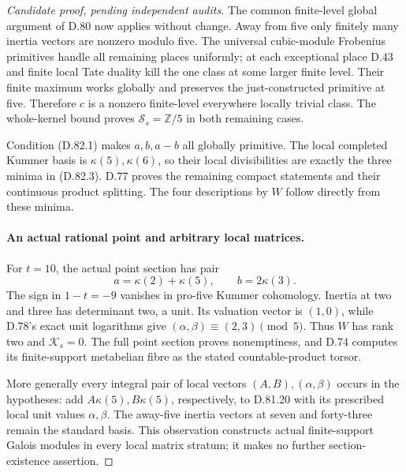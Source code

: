 \begin{proof}[Candidate proof, pending independent audits]
The common finite-level global argument of D.80 now
applies without change. Away from five only finitely
many inertia vectors are nonzero modulo five.
The universal cubic-module Frobenius primitives handle
all remaining places uniformly; at each exceptional
place D.43 and finite local Tate duality kill the one
class at some larger finite level. Their finite maximum
works globally and preserves the just-constructed
primitive at five. Therefore \(c\) is a nonzero
finite-level everywhere locally trivial class. The
whole-kernel bound proves
\(\mathcal S_s=\mathbb Z/5\) in both remaining cases.

Condition (D.82.1) makes \(a,b,a-b\) all globally
primitive. The local completed Kummer basis is
\(\kappa(5),\kappa(6)\), so their local divisibilities
are exactly the three minima in (D.82.3).
D.77 proves the remaining compact statements and their
continuous product splitting. The four descriptions
by \(W\) follow directly from these minima.

\paragraph{An actual rational point and arbitrary local matrices.}
For \(t=10\), the actual point section has pair
\[
        a=\kappa(2)+\kappa(5),\qquad b=2\kappa(3).
                                                               \tag{D.82.20}
\]
The sign in \(1-t=-9\) vanishes in pro-five Kummer cohomology.
Inertia at two and three has determinant two, a unit.
Its valuation vector is \((1,0)\), while D.78's exact
unit logarithms give
\((\alpha,\beta)\equiv(2,3)\pmod5\).
Thus \(W\) has rank two and \(\mathcal K_s=0\).
The full point section proves nonemptiness, and D.74
computes its finite-support metabelian fibre as the
stated countable-product torsor.

More generally every integral pair of local vectors
\((A,B),(\alpha,\beta)\) occurs in the hypotheses:
add \(A\kappa(5),B\kappa(5)\), respectively, to
D.81.20 with its prescribed local unit values
\(\alpha,\beta\). The away-five inertia vectors at
seven and forty-three remain the standard basis.
This observation constructs actual finite-support
Galois modules in every local matrix stratum; it makes
no further section-existence assertion.
\end{proof}

